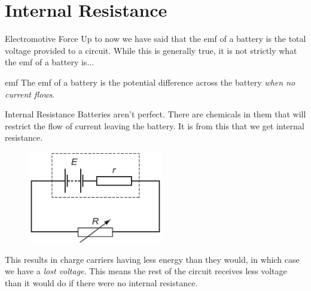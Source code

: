 \documentclass[../Main.tex]{subfiles}
\begin{document}
\author{Internal Resistance} %
\date{Year 1 Topic 15} %

\section{Internal Resistance} %

\begin{frame}{Electromotive Force}
    Up to now we have said that the emf of a battery is the total voltage provided to a circuit. While this is generally true, it is not strictly what the emf of a battery is...
    \pause
    \begin{block}{emf}
    The emf of a battery is the potential difference across the battery \emph{when no current flows}. 
    \end{block}
\end{frame}

\begin{frame}{Internal Resistance}
     Batteries aren't perfect. There are chemicals in them that will restrict the flow of current leaving the battery. It is from this that we get internal resistance. 
    \begin{figure}
        \centering
        \includegraphics[height=4cm]{Electricity_Images/internal_resistance_circuit.png}
    \end{figure}
    This results in charge carriers having less energy than they would, in which case we have a \emph{lost voltage}.
    This means the rest of the circuit receives less voltage than it would do if there were no internal resistance.
\end{frame}
\end{document}
